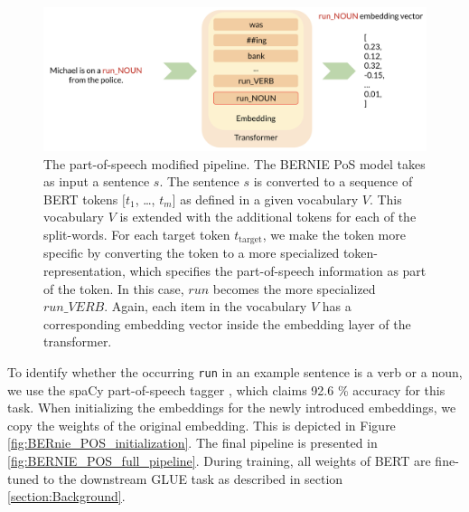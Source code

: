 \documentclass[a4paper,12pt,oneside,openright]{report}
\begin{document}
\begin{figure}
	\center
  \includegraphics[width=\linewidth]{./assets/experiments/pipeline_tokenizer_BERnie_POS_input.png}
  \caption{The part-of-speech modified pipeline. 
  The BERNIE PoS model takes as input a sentence $s$. The sentence $s$ is converted to a sequence of BERT tokens $[t_1$, \ldots, $t_m]$ as defined in a given vocabulary $V$.
    This vocabulary $V$ is extended with the additional tokens for each of the split-words.
For each target token $t_{\text{target}}$, we make the token more specific by converting the token to a more specialized token-representation, which specifies the part-of-speech information as part of the token.
In this case, $run$ becomes the more specialized $run\_ VERB$.
Again, each item in the vocabulary $V$ has a corresponding embedding vector inside the embedding layer of the transformer.
}
  \label{fig:BERnie_POS_pipeline}
\end{figure}


To identify whether the occurring \Verb#run# in an example sentence is a verb or a noun, we use the spaCy part-of-speech tagger \cite{spacyb}, which claims 92.6 \% accuracy for this task.
When initializing the embeddings for the newly introduced embeddings, we copy the weights of the original embedding.
This is depicted in Figure \ref{fig:BERnie_POS_initialization}.
The final pipeline is presented in \ref{fig:BERNIE_POS_full_pipeline}.
During training, all weights of BERT are fine-tuned to the downstream GLUE task as described in section \ref{section:Background}.
\end{document}
